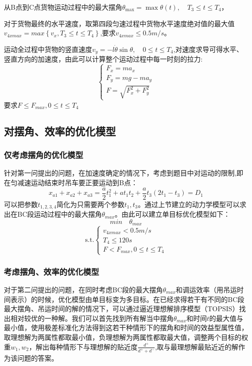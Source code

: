 \documentclass[withoutpreface,bwprint]{cumcmthesis} %
\begin{document}
从B点到C点货物运动过程中的最大摆角$\theta_{\max }=\max \theta(t), \quad T_3 \leqslant t \leqslant T_{4}$，

对于货物最终的水平速度，取第四段匀速过程中货物水平速度绝对值的最大值$v_{4xmax}=max\left \{v_{x},T_3 \leq t \leq T_4\right \}$,要求$v_{4xmax} \leq 0.5m/s$。

运动全过程中货物的竖直速度$v_{y}=-l\dot{\theta}\sin\theta,\quad 0\leq t\leq T_4$,对速度求导可得水平、竖直方向的加速度，由此可以计算整个运动过程中每一时刻的拉力:$$\left\{\begin{array}{l}
        F_{x}=m a_{x}   \\
        F_{y}=mg-ma_{y} \\
        F=\sqrt{F_{x}^2 + F_{y}^2}
    \end{array}\right.$$
要求$F \leq F_{max},0 \leq t \leq T_4$

\subsection{对摆角、效率的优化模型}
\subsubsection{仅考虑摆角的优化模型}
针对第一问提出的问题，在加速度确定的情况下，考虑到题目中对运动的限制,即在匀减速运动结束时吊车要正要运动到B点：$$x_{a1}+x_{a2}+x_{a3}=\frac{a}{2}t_1^2+at_1t_2+\frac{a}{2}t_3(2t_1-t_3)=D_1$$可以把参数$t_{1,2,3,4}$简化为只需要两个参数$t_1,t_3$。通过上节建立的动力学模型可以求出在BC段运动过程中的最大摆角$\theta_{max}$。由此可以建立单目标优化模型如下：
$$min\quad \theta_{max}$$
$$\text{s.t.}\left \{\begin{array}{l}
    v_{4xmax}<0.5m/s \\
    T_4\leq120s \\
    F<F_{max},0\leq t\leq T_4
\end{array}\right.$$

\subsubsection{考虑摆角、效率的优化模型}
对于第二问提出的问题，在同时考虑BC段的最大摆角$\theta_{max}$和调运效率（用吊运时间表示）的时候，优化模型由单目标变为多目标。在已经求得若干有不同的BC段最大摆角、吊运时间的解的情况下，可以通过逼近理想解排序模型（TOPSIS）找出相对较优的一种解。我们可以首先找到所有解当中摆角$\theta_{max}$和时间$t$的最大值与最小值，使用极差标准化方法得到这若干种情形下的摆角和时间的效益型属性值，取理想解为两属性都取最小值，负理想解为两属性都取最大值，调整两个目标的权重$w_1,w_2$，解出每种情形下与理想解的贴近度$\frac{d^+}{d^++d^-}$,取与最理想解最贴近近的解作为该问题的答案。
\end{document}
